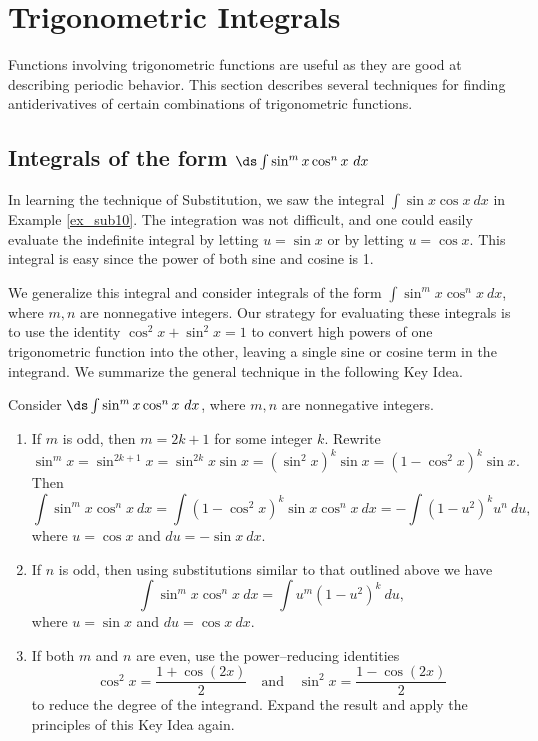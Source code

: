 

\section{Trigonometric Integrals}\label{sec:trigint}

Functions involving trigonometric functions are useful as they are good at describing periodic behavior. This section describes several techniques for finding antiderivatives of certain combinations of trigonometric functions.\\

\subsection*{Integrals of the form $\ds \int \sin^m x\cos^n x\ dx$}

In learning the technique of Substitution, we saw the integral $\int \sin x\cos x\ dx$ in Example \ref{ex_sub10}. The integration was not difficult, and one could easily evaluate the indefinite integral by letting $u=\sin x$ or by letting $u = \cos x$. This integral is easy since the power of both sine and cosine is 1.

We generalize this integral and consider integrals of the form $\int \sin^mx\cos^nx\ dx$, where $m,n$ are nonnegative integers. Our strategy for evaluating these integrals is to use the identity $\cos^2x+\sin^2x=1$ to convert high powers of one trigonometric function into the other, leaving a single sine or cosine term in the integrand. We summarize the general technique in the following Key Idea.

\setboxwidth{60pt}
\noindent\ifthenelse{\isodd{\thepage}}{}{\hskip -60pt}
\begin{minipage}{\specialboxlength}
{Consider $\ds \int \sin^mx\cos^nx\ dx$, where $m,n$ are nonnegative integers.
	\begin{enumerate}
	\item		If $m$ is odd, then $m=2k+1$ for some integer $k$. Rewrite \small
			$$ \sin^mx = \sin^{2k+1}x = \sin^{2k}x\sin x = (\sin^2x)^k\sin x = (1-\cos^2x)^k\sin x.$$\normalsize
			Then \small
			$$\int \sin^mx\cos^nx\ dx = \int (1-\cos^2x)^k\sin x\cos^nx\ dx = -\int (1-u^2)^ku^n\ du,$$\normalsize
			where $u = \cos x$ and $du = -\sin x\ dx$. 
	\item		If $n$ is odd, then using substitutions similar to that outlined above we have
			\small
			$$ \int \sin^mx\cos^nx\ dx = \int u^m(1-u^2)^k\ du,$$ \normalsize
			where $u = \sin x$ and $du = \cos x\ dx$.
	\item		If both $m$ and $n$ are even, use the power--reducing identities
		\small$$  \cos^2x = \frac{1+\cos (2x)}{2} \quad \text{and}\quad \sin^2x = \frac{1-\cos(2x)}2$$\normalsize
	to reduce the degree of the integrand. Expand the result and apply the principles of this Key Idea again.
	\end{enumerate}
}
\end{minipage}
\restoreboxwidth

